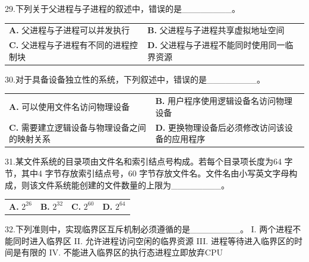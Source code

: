 \documentclass[UTF8,11pt]{ctexart}
\begin{document}
29.下列关于父进程与子进程的叙述中，错误的是\_\_\_\_\_\_\_\_。


\begin{center}\begin{tabular}{>{\raggedright\arraybackslash}p{\dimexpr(\linewidth-4\tabcolsep)/2\relax}>{\raggedright\arraybackslash}p{\dimexpr(\linewidth-4\tabcolsep)/2\relax}}
\textbf{A.} 父进程与子进程可以并发执行 & \textbf{B.} 父进程与子进程共享虚拟地址空间\\[.35em]
\textbf{C.} 父进程与子进程有不同的进程控制块 & \textbf{D.} 父进程与子进程不能同时使用同一临界资源\\[.35em]\end{tabular}\end{center}

30.对于具备设备独立性的系统，下列叙述中，错误的是\_\_\_\_\_\_\_\_。


\begin{center}\begin{tabular}{>{\raggedright\arraybackslash}p{\dimexpr(\linewidth-4\tabcolsep)/2\relax}>{\raggedright\arraybackslash}p{\dimexpr(\linewidth-4\tabcolsep)/2\relax}}
\textbf{A.} 可以使用文件名访问物理设备 & \textbf{B.} 用户程序使用逻辑设备名访问物理设备\\[.35em]
\textbf{C.} 需要建立逻辑设备与物理设备之间的映射关系 & \textbf{D.} 更换物理设备后必须修改访问该设备的应用程序\\[.35em]\end{tabular}\end{center}

31.某文件系统的目录项由文件名和索引结点号构成。若每个目录项长度为64 字节，其中4 字节存放索引结点号，60 字节存放文件名。文件名由小写英文字母构成，则该文件系统能创建的文件数量的上限为\_\_\_\_\_\_\_\_。


\begin{center}\begin{tabular}{>{\raggedright\arraybackslash}p{\dimexpr(\linewidth-8\tabcolsep)/4\relax}>{\raggedright\arraybackslash}p{\dimexpr(\linewidth-8\tabcolsep)/4\relax}>{\raggedright\arraybackslash}p{\dimexpr(\linewidth-8\tabcolsep)/4\relax}>{\raggedright\arraybackslash}p{\dimexpr(\linewidth-8\tabcolsep)/4\relax}}
\textbf{A.} \(\displaystyle 2^{26}\) & \textbf{B.} \(\displaystyle 2^{32}\) & \textbf{C.} \(\displaystyle 2^{60}\) & \textbf{D.} \(\displaystyle 2^{64}\)\\[.35em]\end{tabular}\end{center}

32.下列准则中，实现临界区互斥机制必须遵循的是\_\_\_\_\_\_\_\_。 I. 两个进程不能同时进入临界区 II. 允许进程访问空闲的临界资源 III. 进程等待进入临界区的时间是有限的 IV. 不能进入临界区的执行态进程立即放弃CPU
\end{document}
